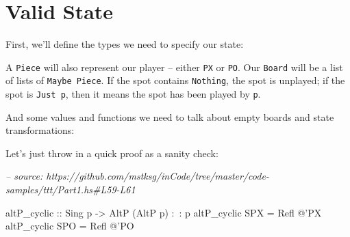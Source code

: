\documentclass[]{article}
\newenvironment{Shaded}{}{}
\newcommand{\CommentTok}[1]{\textcolor[rgb]{0.38,0.63,0.69}{\textit{#1}}}
\newcommand{\DataTypeTok}[1]{\textcolor[rgb]{0.56,0.13,0.00}{#1}}
\newcommand{\FunctionTok}[1]{\textcolor[rgb]{0.02,0.16,0.49}{#1}}
\newcommand{\NormalTok}[1]{#1}
\newcommand{\OtherTok}[1]{\textcolor[rgb]{0.00,0.44,0.13}{#1}}
\begin{document}
\hypertarget{valid-state}{%
\section{Valid State}\label{valid-state}}

First, we'll define the types we need to specify our state:

\begin{Shaded}
\end{Shaded}

A \texttt{Piece} will also represent our player -- either \texttt{PX} or
\texttt{PO}. Our \texttt{Board} will be a list of lists of
\texttt{Maybe\ Piece}. If the spot contains \texttt{Nothing}, the spot is
unplayed; if the spot is \texttt{Just\ p}, then it means the spot has been
played by \texttt{p}.

And some values and functions we need to talk about empty boards and state
transformations:

\begin{Shaded}
\end{Shaded}

Let's just throw in a quick proof as a sanity check:

\begin{Shaded}
\begin{Highlighting}[]
\CommentTok{-- source: https://github.com/mstksg/inCode/tree/master/code-samples/ttt/Part1.hs#L59-L61}

\OtherTok{altP_cyclic ::} \DataTypeTok{Sing}\NormalTok{ p }\OtherTok{->} \DataTypeTok{AltP}\NormalTok{ (}\DataTypeTok{AltP}\NormalTok{ p) }\FunctionTok{:~:}\NormalTok{ p}
\NormalTok{altP_cyclic }\DataTypeTok{SPX} \FunctionTok{=} \DataTypeTok{Refl} \FunctionTok{@}\NormalTok{'}\DataTypeTok{PX}
\NormalTok{altP_cyclic }\DataTypeTok{SPO} \FunctionTok{=} \DataTypeTok{Refl} \FunctionTok{@}\NormalTok{'}\DataTypeTok{PO}
\end{Highlighting}
\end{Shaded}
\end{document}
